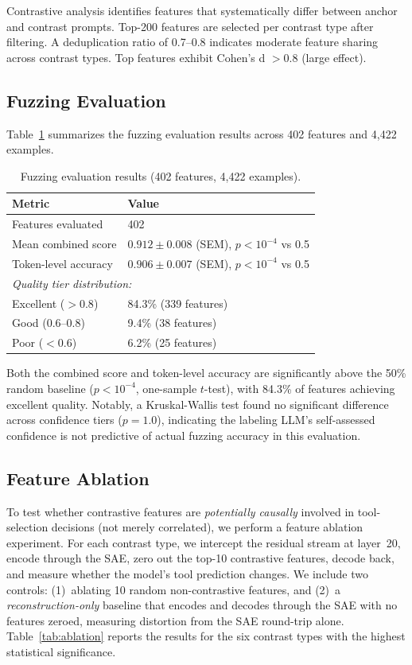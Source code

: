 \documentclass[runningheads]{llncs}
\begin{document}
Contrastive analysis identifies features that systematically differ between anchor and contrast prompts. Top-200 features are selected per contrast type after filtering. A deduplication ratio of 0.7--0.8 indicates moderate feature sharing across contrast types. Top features exhibit Cohen's d $> 0.8$ (large effect).

\subsection{Fuzzing Evaluation}

Table~\ref{tab:fuzzing} summarizes the fuzzing evaluation results across 402 features and 4,422 examples.

\begin{table}[t]
\caption{Fuzzing evaluation results (402 features, 4,422 examples).}
\label{tab:fuzzing}
\centering
\begin{tabular}{ll}
\toprule
Metric & Value \\
\midrule
Features evaluated & 402 \\
Mean combined score & $0.912 \pm 0.008$ (SEM), $p < 10^{-4}$ vs 0.5 \\
Token-level accuracy & $0.906 \pm 0.007$ (SEM), $p < 10^{-4}$ vs 0.5 \\
\midrule
\multicolumn{2}{l}{\textit{Quality tier distribution:}} \\
Excellent ($> 0.8$) & 84.3\% (339 features) \\
Good ($0.6$--$0.8$) & 9.4\% (38 features) \\
Poor ($< 0.6$) & 6.2\% (25 features) \\
\bottomrule
\end{tabular}
\end{table}

Both the combined score and token-level accuracy are significantly above the 50\% random baseline ($p < 10^{-4}$, one-sample $t$-test), with 84.3\% of features achieving excellent quality. Notably, a Kruskal-Wallis test found no significant difference across confidence tiers ($p = 1.0$), indicating the labeling LLM's self-assessed confidence is not predictive of actual fuzzing accuracy in this evaluation.

\subsection{Feature Ablation}
\label{sec:ablation}

To test whether contrastive features are \emph{potentially causally} involved in tool-selection decisions (not merely correlated), we perform a feature ablation experiment. For each contrast type, we intercept the residual stream at layer~20, encode through the SAE, zero out the top-10 contrastive features, decode back, and measure whether the model's tool prediction changes. We include two controls: (1)~ablating 10 random non-contrastive features, and (2)~a \emph{reconstruction-only} baseline that encodes and decodes through the SAE with no features zeroed, measuring distortion from the SAE round-trip alone. Table~\ref{tab:ablation} reports the results for the six contrast types with the highest statistical significance.
\end{document}
